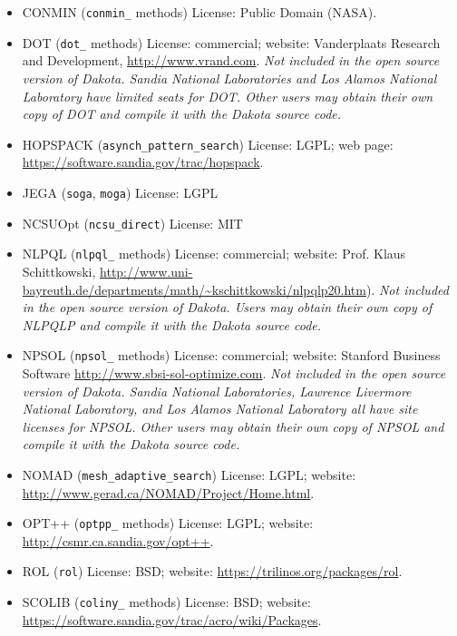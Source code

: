 \begin{itemize}

\item CONMIN (\texttt{conmin\_} methods) License: Public Domain
  (NASA).

\item DOT (\texttt{dot\_} methods) License: commercial; website:
  Vanderplaats Research and Development,
  \url{http://www.vrand.com}. {\em Not included in the open source
    version of Dakota.  Sandia National Laboratories and Los Alamos
    National Laboratory have limited seats for DOT. Other users may
    obtain their own copy of DOT and compile it with the Dakota source
    code.}

\item HOPSPACK (\texttt{asynch\_pattern\_search}) License: LGPL; web
  page: \url{https://software.sandia.gov/trac/hopspack}.

\item JEGA (\texttt{soga}, \texttt{moga}) License: LGPL

\item NCSUOpt (\texttt{ncsu\_direct}) License: MIT

\item NLPQL (\texttt{nlpql\_} methods) License: commercial; website:
  Prof. Klaus Schittkowski,
  \url{http://www.uni-bayreuth.de/departments/math/~kschittkowski/nlpqlp20.htm}). \emph{Not included in the open source version of Dakota.  Users may
    obtain their own copy of NLPQLP and compile it with the Dakota
    source code.}

\item NPSOL (\texttt{npsol\_} methods) License: commercial; website:
  Stanford Business Software
  \url{http://www.sbsi-sol-optimize.com}. {\em Not included in the
    open source version of Dakota.  Sandia National Laboratories,
    Lawrence Livermore National Laboratory, and Los Alamos National
    Laboratory all have site licenses for NPSOL. Other users may
    obtain their own copy of NPSOL and compile it with the Dakota
    source code.}

\item NOMAD (\texttt{mesh\_adaptive\_search}) License: LGPL; website:
  \url{http://www.gerad.ca/NOMAD/Project/Home.html}.

\item OPT++ (\texttt{optpp\_} methods) License: LGPL; website:
  \url{http://csmr.ca.sandia.gov/opt++}.

\item ROL (\texttt{rol}) License: BSD; website:
  \url{https://trilinos.org/packages/rol}.

\item SCOLIB (\texttt{coliny\_} methods) License: BSD; website:
  \url{https://software.sandia.gov/trac/acro/wiki/Packages}.

\end{itemize}


